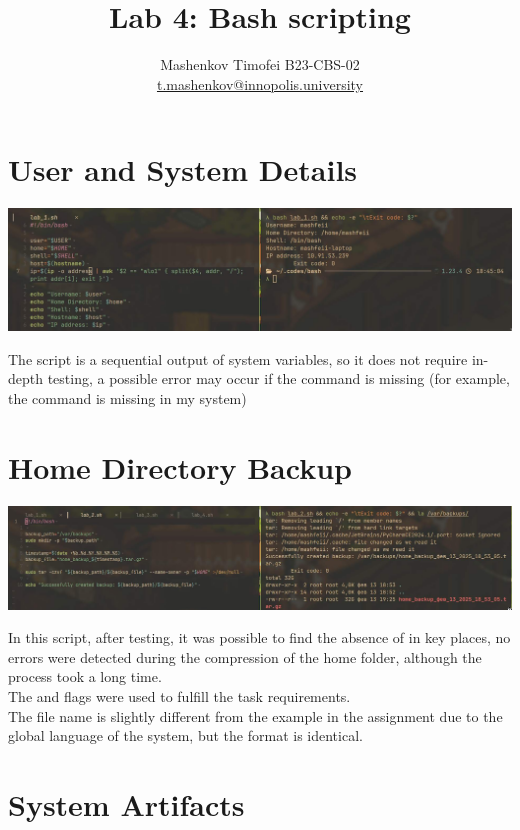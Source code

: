 \documentclass{article}
\title{Lab 4: Bash scripting}
\author{Mashenkov Timofei B23-CBS-02 \\ \href{mailto:t.mashenkov@innopolis.university}{t.mashenkov@innopolis.university}}
\begin{document}
\maketitle{}

\section{User and System Details}
\noindent

\includegraphics[width=460pt]{4_1.jpg}
\newline

The script is a sequential output of system variables, so it does not require in-depth testing, a possible error may
occur if the  command is missing (for example, the  command is missing in my system)

\section{Home Directory Backup}
\noindent

\includegraphics[width=460pt]{4_2.jpg}
\newline

In this script, after testing, it was possible to find the absence of  in key places, no errors were
detected during the compression of the home folder, although the process took a long time. \\
The  and  flags were used to fulfill the task requirements. \\
The file name is slightly different from the example in the assignment due to the global language of the system, but the format is identical.

\section{System Artifacts}
\noindent
\end{document}

